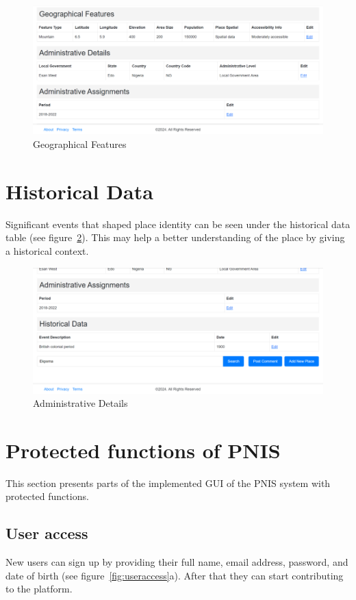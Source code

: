 \begin{figure}[htb]
    \centering
    \includegraphics[width=\textwidth]{moreDetails2Geo.png}
    \caption{Geographical Features}
    \label{fig:moreDetails2Geo}
\end{figure}

\section{Historical Data}
Significant events that shaped place identity can be seen under the historical data table (see figure~\ref{fig:moreDetails3AdmDetails}). This may help a better understanding of the place by giving a historical context.

\begin{figure}[htb]
    \centering
    \includegraphics[width=\textwidth]{moreDetails3AdmDetails.png}
    \caption{Administrative Details}
    \label{fig:moreDetails3AdmDetails}
\end{figure}

\section{Protected functions of PNIS}
This section presents parts of the implemented GUI of the PNIS system with protected functions. 

\subsection{User access}
New users can sign up by providing their full name, email address, password, and date of birth (see figure~\ref{fig:useraccess}a). After that they can start contributing to the platform.

